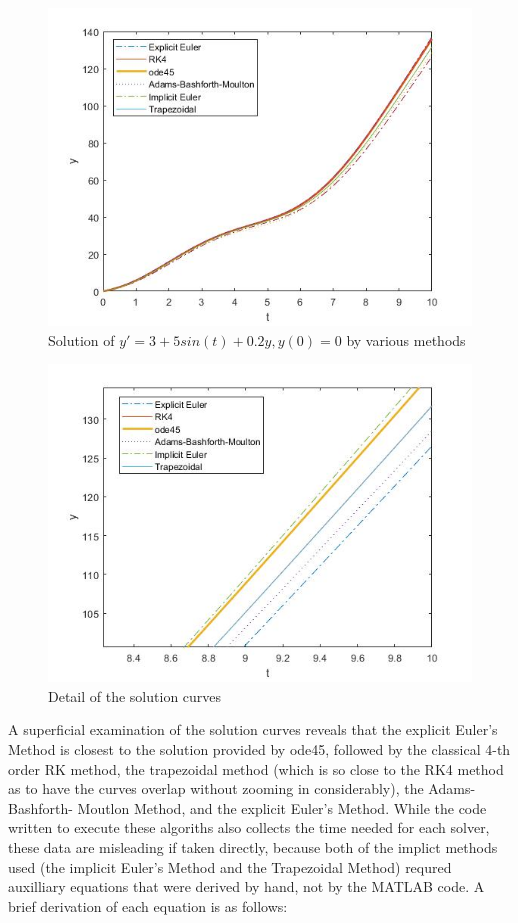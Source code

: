 \documentclass[11pt]{article}
\begin{document}
\begin{figure} [ht]
\centering
        \includegraphics[totalheight=10cm]{Plot1aa.jpg}
    \caption{Solution of $y'=3+5sin(t)+0.2y, y(0)=0$ by various methods}
    \label{fig:verticalcell}
\end{figure}

\begin{figure} [ht]
\centering
        \includegraphics[totalheight=10cm]{Plot1ab.jpg}
    \caption{Detail of the solution curves}
    \label{fig:verticalcell}
\end{figure}

A superficial examination of the solution curves reveals that the explicit Euler's
Method is closest to the solution provided by ode45, followed by the classical 
4-th order RK method, the trapezoidal method (which is so close to the RK4 method
as to have the curves overlap without zooming in considerably), the Adams-Bashforth-
Moutlon Method, and the explicit Euler's Method. While the code written to execute
these algoriths also collects the time needed for each solver, these data are 
misleading if taken directly, because both of the implict methods used (the implicit
Euler's Method and the Trapezoidal Method) requred auxilliary equations that were
derived by hand, not by the MATLAB code. A brief derivation of each equation is
as follows:
\end{document}
